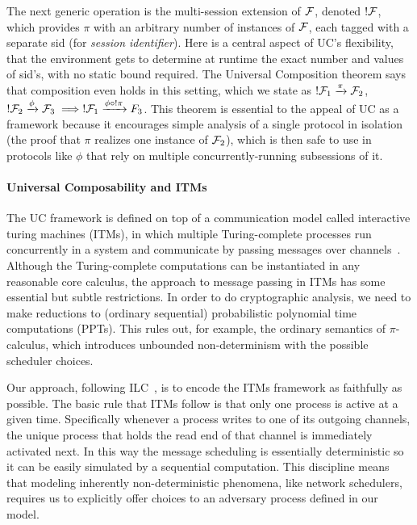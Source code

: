 The next generic operation is the multi-session extension of $\mathcal{F}$, denoted $!\mathcal{F}$, which provides $\pi$ with an arbitrary number of instances of $\mathcal{F}$, each tagged with a separate \textsf{sid} (for \emph{session identifier}).
Here is a central aspect of UC's flexibility, that the environment gets to determine at runtime the exact number and values of \textsf{sid}'s, with no static bound required.
The Universal Composition theorem says that composition even holds in this setting, which we state as
$!\mathcal{F}_1 \xrightarrow{\pi} \mathcal{F}_2$, $!\mathcal{F}_2 \xrightarrow{\phi} \mathcal{F}_3 \implies !\mathcal{F}_1 \xrightarrow{\phi \circ !\pi} F_3$.
This theorem is essential to the appeal of UC as a framework because it encourages simple analysis of a single protocol in isolation (the proof that $\pi$ realizes one instance of $\mathcal{F}_2$), which is then safe to use in protocols like $\phi$ that rely on multiple concurrently-running subsessions of it.

\paragraph{Universal Composability and ITMs}
The UC framework is defined on top of a communication model called interactive turing machines (ITMs), in which multiple Turing-complete processes run concurrently in a system and communicate by passing messages over channels~\cite{canettiUC}.
Although the Turing-complete computations can be instantiated in any reasonable core calculus, the approach to message passing in ITMs has some essential but subtle restrictions.
In order to do cryptographic analysis, we need to make reductions to (ordinary sequential) probabilistic polynomial time computations (PPTs).
This rules out, for example, the ordinary semantics of $\pi$-calculus, which introduces unbounded non-determinism with the possible scheduler choices.

Our approach, following ILC~\cite{ilc}, is to encode the ITMs framework as faithfully as possible.
The basic rule that ITMs follow is that only one process is active at a given time. 
Specifically whenever a process writes to one of its outgoing channels, the unique process that holds the read end of that channel is immediately activated next.
In this way the message scheduling is essentially deterministic so it can be easily simulated by a sequential computation.
This discipline means that modeling inherently non-deterministic phenomena, like network schedulers, requires us to explicitly offer choices to an adversary process defined in our model.

